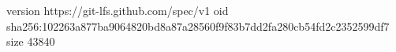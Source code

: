version https://git-lfs.github.com/spec/v1
oid sha256:102263a877ba9064820bd8a87a28560f9f83b7dd2fa280cb54fd2c2352599df7
size 43840
